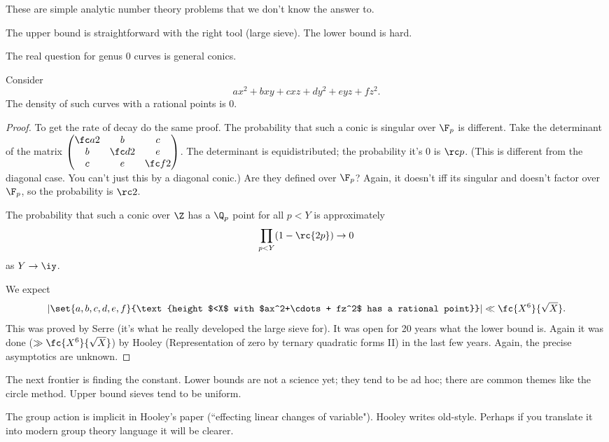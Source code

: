 These are simple analytic number theory problems that we don't know the answer to.

The upper bound is straightforward with the right tool (large sieve). The lower bound is hard.

The real question for genus 0 curves is general conics.
\begin{ex}
Consider
\[
ax^2+bxy+cxz+dy^2 + eyz + fz^2.
\]
The density of such curves with a rational points is 0.
\end{ex}
\begin{proof}
To get the rate of decay do the same proof. The probability that such a conic is singular over $\F_p$ is different. Take the determinant  of the matrix $\begin{pmatrix}
\fc a2&b & c\\
 b & \fc d2 & e\\
c & e &\fc f2
\end{pmatrix}$.
The determinant is equidistributed; the probability it's 0 is $\rc p$. (This is different from the diagonal case.
You can't just this by a diagonal conic.)
Are they defined over $\F_p$? Again, it doesn't iff its singular and doesn't factor over $\F_p$, so the probability is $\rc2$. 

The probability that such a conic over $\Z$ has a $\Q_p$ point for all $p<Y$ is approximately 
\[\prod_{p<Y} (1-\rc{2p})\to 0\]
as $Y\to \iy$.

We expect
\[
|\set{a,b,c,d,e,f}{\text{height $<X$ with $ax^2+\cdots + fz^2$ has a rational point}}|\ll \fc{X^6}{\sqrt{X}}.
\]
This was proved by Serre (it's what he really developed the large sieve for). It was open for 20 years what the lower bound is. Again it was done ($\gg \fc{X^6}{\sqrt{X}}$) by Hooley (Representation of zero by ternary quadratic forms II) in the last few years. Again, the precise asymptotics are unknown. 
\end{proof}
The next frontier is finding the constant. 
Lower bounds are not a science yet; they tend to be ad hoc; there are common themes like the circle method. Upper bound sieves tend to be uniform. 

The group action is implicit in Hooley's paper (``effecting linear changes of variable"). Hooley writes old-style. Perhaps if you translate it into modern group theory language it will be clearer.

